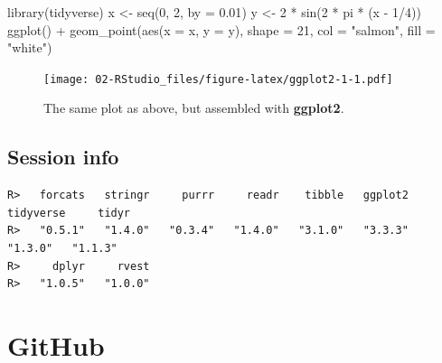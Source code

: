 \documentclass[
]{book}
\newenvironment{Shaded}{\begin{snugshade}}{\end{snugshade}}
\newcommand{\AttributeTok}[1]{\textcolor[rgb]{0.77,0.63,0.00}{#1}}
\newcommand{\DecValTok}[1]{\textcolor[rgb]{0.00,0.00,0.81}{#1}}
\newcommand{\FloatTok}[1]{\textcolor[rgb]{0.00,0.00,0.81}{#1}}
\newcommand{\FunctionTok}[1]{\textcolor[rgb]{0.00,0.00,0.00}{#1}}
\newcommand{\NormalTok}[1]{#1}
\newcommand{\OtherTok}[1]{\textcolor[rgb]{0.56,0.35,0.01}{#1}}
\newcommand{\SpecialCharTok}[1]{\textcolor[rgb]{0.00,0.00,0.00}{#1}}
\newcommand{\StringTok}[1]{\textcolor[rgb]{0.31,0.60,0.02}{#1}}
\begin{document}
\begin{Shaded}
\begin{Highlighting}[]
\FunctionTok{library}\NormalTok{(tidyverse)}
\NormalTok{x }\OtherTok{\textless{}{-}} \FunctionTok{seq}\NormalTok{(}\DecValTok{0}\NormalTok{, }\DecValTok{2}\NormalTok{, }\AttributeTok{by =} \FloatTok{0.01}\NormalTok{)}
\NormalTok{y }\OtherTok{\textless{}{-}} \DecValTok{2} \SpecialCharTok{*} \FunctionTok{sin}\NormalTok{(}\DecValTok{2} \SpecialCharTok{*}\NormalTok{ pi }\SpecialCharTok{*}\NormalTok{ (x }\SpecialCharTok{{-}} \DecValTok{1}\SpecialCharTok{/}\DecValTok{4}\NormalTok{))}
\FunctionTok{ggplot}\NormalTok{() }\SpecialCharTok{+}
  \FunctionTok{geom\_point}\NormalTok{(}\FunctionTok{aes}\NormalTok{(}\AttributeTok{x =}\NormalTok{ x, }\AttributeTok{y =}\NormalTok{ y), }\AttributeTok{shape =} \DecValTok{21}\NormalTok{, }\AttributeTok{col =} \StringTok{"salmon"}\NormalTok{, }\AttributeTok{fill =} \StringTok{"white"}\NormalTok{)}
\end{Highlighting}
\end{Shaded}

\begin{figure}
\centering
\texttt{[image: 02-RStudio\_files/figure-latex/ggplot2-1-1.pdf]}
\caption{\label{fig:ggplot2-1}The same plot as above, but assembled with \textbf{ggplot2}.}
\end{figure}

\hypertarget{session-info-1}{%
\section{Session info}\label{session-info-1}}

\begin{Shaded}
\end{Shaded}

\begin{verbatim}
R>   forcats   stringr     purrr     readr    tibble   ggplot2 tidyverse     tidyr 
R>   "0.5.1"   "1.4.0"   "0.3.4"   "1.4.0"   "3.1.0"   "3.3.3"   "1.3.0"   "1.1.3" 
R>     dplyr     rvest 
R>   "1.0.5"   "1.0.0"
\end{verbatim}

\hypertarget{github}{%
\chapter{GitHub}\label{github}}
\end{document}
